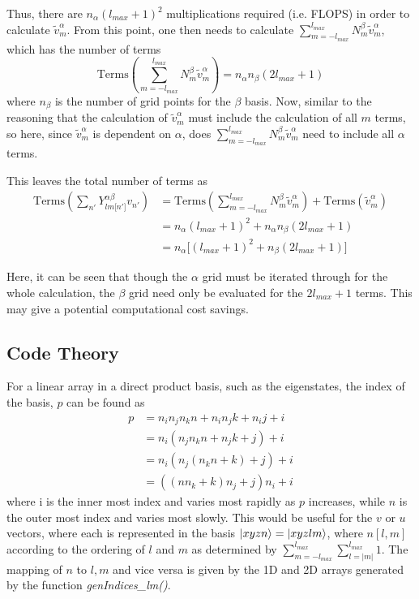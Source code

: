 \documentclass{revtex4-1}
\begin{document}
Thus, there are $n_{\alpha}\left(l_{max}+1\right)^{2}$ multiplications required (i.e. FLOPS) in order to calculate $\tilde{v}_{m}^{\alpha}$. From this point, one then needs to calculate $\sum_{m=-l_{max}}^{l_{max}}N_{m}^{\beta}\tilde{v}_{m}^{\alpha}$, which has the number of terms
\begin{equation}\label{E:GaussQuadLinRotPotPartSumOutSum}
\mbox{Terms}\!\left(\sum_{m=-l_{max}}^{l_{max}}N_{m}^{\beta}\tilde{v}_{m}^{\alpha}\right) = n_{\alpha}n_{\beta}\left(2l_{max}+1\right)
\end{equation}
where $n_{\beta}$ is the number of grid points for the $\beta$ basis. Now, similar to the reasoning that the calculation of $\tilde{v}_{m}^{\alpha}$ must include the calculation of all $m$ terms, so here, since $\tilde{v}_{m}^{\alpha}$ is dependent on $\alpha$, does $\sum_{m=-l_{max}}^{l_{max}}N_{m}^{\beta}\tilde{v}_{m}^{\alpha}$ need to include all $\alpha$ terms.

This leaves the total number of terms as
\begin{align}
\mbox{Terms}\!\left(\sum_{n'}Y_{lm\lbrack n'\rbrack}^{\alpha\beta}v_{n'}\right) 	&= \mbox{Terms}\!\left(\sum_{m=-l_{max}}^{l_{max}}N_{m}^{\beta}\tilde{v}_{m}^{\alpha}\right) + \mbox{Terms}\!\left(\tilde{v}_{m}^{\alpha}\right) \\
																				&= n_{\alpha}\left(l_{max}+1\right)^{2} + n_{\alpha}n_{\beta}\left(2l_{max}+1\right)\\
																				&= n_{\alpha}\lbrack\left(l_{max}+1\right)^{2} + n_{\beta}\left(2l_{max}+1\right)\rbrack
\end{align}

Here, it can	be seen that though the $\alpha$ grid must be iterated through for the whole calculation, the $\beta$ grid need only be evaluated for the $2l_{max}+1$ terms. This may give a potential computational cost savings.

\subsection{Code Theory}\label{S:CodeTheory}
For a linear array in a direct product basis, such as the eigenstates, the index of the basis, $p$ can be found as
\begin{align}
p &= n_{i}n_{j}n_{k}n + n_{i}n_{j}k + n_{i}j + i\\
  &= n_{i}(n_{j}n_{k}n + n_{j}k + j) + i\\
  &= n_{i}(n_{j}(n_{k}n + k) + j) + i\\
  &= ((nn_{k}+k)n_{j} + j)n_{i} + i
\end{align}
where i is the inner most index and varies most rapidly as $p$ increases, while $n$ is the outer most index and varies most slowly. This would be useful for the $v$ or $u$ vectors, where each is represented in the basis $\ket{xyzn} = \ket{xyzlm}$, where $n[l,m]$ according to the ordering of $l$ and $m$ as determined by $\sum_{m=-l_{max}}^{l_{max}}\sum_{l=|m|}^{l_{max}}1$. The mapping of $n$ to $l,m$ and vice versa is given by the 1D and 2D arrays generated by the function {\em genIndices\_lm()}.
													
\end{document}
